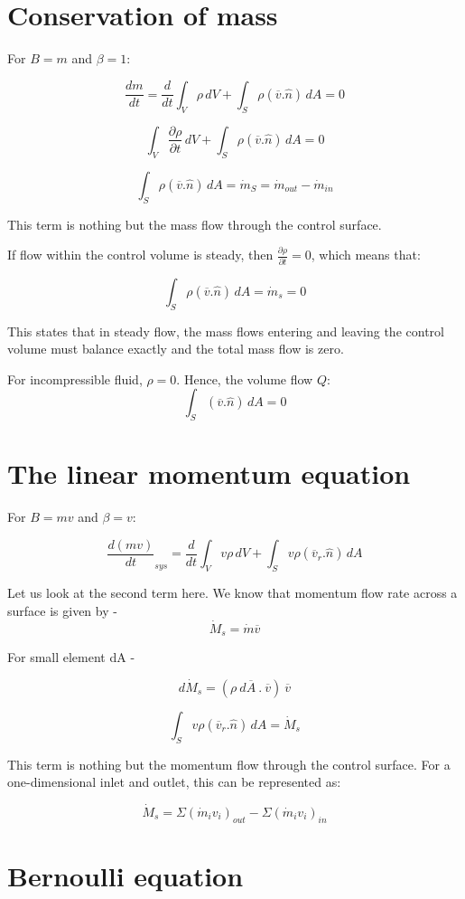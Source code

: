 \documentclass{report}
\begin{document}
\section{Conservation of mass}
For \( B=m \) and \( \beta=1 \):

\[ \frac{dm}{dt} = \frac{d}{dt} \int_V \rho \,dV + \int_S \rho (\overline{v}.\hat{n}) \,dA =0 \] 

\[ \int_V \frac{\partial\rho}{\partial t} \,dV + \int_S \rho (\overline{v}.\hat{n}) \,dA =0 \]

\[ \int_S \rho (\overline{v}.\hat{n}) \,dA = \dot{m}_S = \dot{m}_{out} - \dot{m}_{in}\]

This term is nothing but the mass flow through the control surface.

If flow within the control volume is steady, then \( \frac{\partial\rho}{\partial t} = 0 \), which means that:

\[ \int_S \rho(\overline{v}.\hat{n}) \,dA = \dot{m}_s = 0 \]

This states that in steady flow, the mass flows entering and leaving the control volume must balance exactly and the total mass flow is zero.

For incompressible fluid, \( \rho =0 \). Hence, the volume flow \( Q \):
\[ \int_S (\overline{v}.\hat{n}) \,dA = 0 \]

\section{The linear momentum equation}

For \( B=mv \) and \( \beta=v \):

\[ \frac{d(mv)}{dt}_{sys} = \frac{d}{dt} \int_V v \rho \,dV + \int_S v \rho (\overline{v}_r.\hat{n}) \,dA \]

Let us look at the second term here. We know that momentum flow rate across a surface is given by -
\[\dot{M}_s = \dot{m}\overline{v}\]

For small element dA -

\[ d\dot{M}_s = (\rho \ d\overline{A} \ . \ \overline{v} ) \ \overline{v}\]

\[ \int_S v \rho (\overline{v}_r.\hat{n}) \,dA = \dot{M}_s \]

This term is nothing but the momentum flow through the control surface.
For a one-dimensional inlet and outlet, this can be represented as:

\[ \dot{M}_s = \Sigma (\dot{m}_i v_i)_{out} - \Sigma (\dot{m}_i v_i)_{in} \]

\section{Bernoulli equation}
\end{document}
